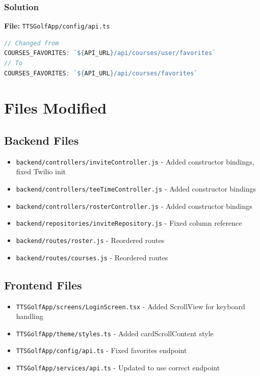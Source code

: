 \documentclass[11pt,a4paper]{article}
\begin{document}
\subsubsection{Solution}

\textbf{File:} \texttt{TTSGolfApp/config/api.ts}
\begin{lstlisting}[language=JavaScript]
// Changed from
COURSES_FAVORITES: `${API_URL}/api/courses/user/favorites`
// To
COURSES_FAVORITES: `${API_URL}/api/courses/favorites`
\end{lstlisting}

\section{Files Modified}

\subsection{Backend Files}
\begin{itemize}
    \item \texttt{backend/controllers/inviteController.js} - Added constructor bindings, fixed Twilio init
    \item \texttt{backend/controllers/teeTimeController.js} - Added constructor bindings
    \item \texttt{backend/controllers/rosterController.js} - Added constructor bindings
    \item \texttt{backend/repositories/inviteRepository.js} - Fixed column reference
    \item \texttt{backend/routes/roster.js} - Reordered routes
    \item \texttt{backend/routes/courses.js} - Reordered routes
\end{itemize}

\subsection{Frontend Files}
\begin{itemize}
    \item \texttt{TTSGolfApp/screens/LoginScreen.tsx} - Added ScrollView for keyboard handling
    \item \texttt{TTSGolfApp/theme/styles.ts} - Added cardScrollContent style
    \item \texttt{TTSGolfApp/config/api.ts} - Fixed favorites endpoint
    \item \texttt{TTSGolfApp/services/api.ts} - Updated to use correct endpoint
\end{itemize}
\end{document}
